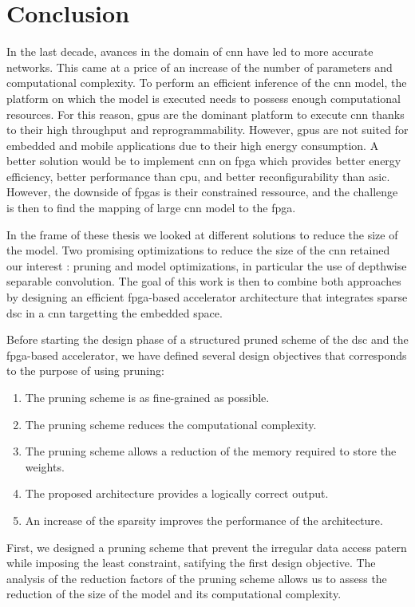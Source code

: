 \chapter*{Conclusion}
%
In the last decade, avances in the domain of \acrshort{cnn} have led to more accurate networks. This came at a price of an increase of the number of parameters and computational complexity. To perform an efficient inference of the \acrshort{cnn} model, the platform on which the model is executed needs to possess enough computational resources. For this reason, \acrshort{gpu}s are the dominant platform to execute \acrshort{cnn} thanks to their high throughput and reprogrammability. However, \acrshort{gpu}s are not suited for embedded and mobile applications due to their high energy consumption. A better solution would be to implement \acrshort{cnn} on \acrshort{fpga} which provides better energy efficiency, better performance than \acrshort{cpu}, and better reconfigurability than \acrshort{asic}. However, the downside of \acrshort{fpga}s is their constrained ressource, and the challenge is then to find the mapping of large \acrshort{cnn} model to the \acrshort{fpga}.

In the frame of these thesis we looked at different solutions to reduce the size of the model. Two promising optimizations to reduce the size of the \acrshort{cnn} retained our interest : pruning and model optimizations, in particular the use of depthwise separable convolution. The goal of this work is then to combine both approaches by designing an efficient \acrshort{fpga}-based accelerator architecture that integrates sparse \acrshort{dsc} in a \acrshort{cnn} targetting the embedded space.

Before starting the design phase of a structured pruned scheme of the \acrshort{dsc} and the \acrshort{fpga}-based accelerator, we have defined several design objectives that corresponds to the purpose of using pruning:
%
\begin{enumerate}
    \item The pruning scheme is as fine-grained as possible.
    \item The pruning scheme reduces the computational complexity.
    \item The pruning scheme allows a reduction of the memory required to store the weights.
    \item The proposed architecture provides a logically correct output.
    \item An increase of the sparsity improves the performance of the architecture.
\end{enumerate}
%
First, we designed a pruning scheme that prevent the irregular data access patern while imposing the least constraint, satifying the first design objective. The analysis of the reduction factors of the pruning scheme allows us to assess the reduction of the size of the model and its computational complexity.

